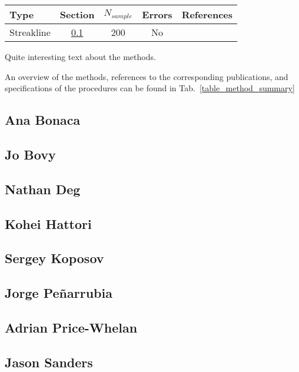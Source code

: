 \begin{table*}
\begin{minipage}{160mm}
\centering
 \caption{Overview of methods and their characteristics.}
\label{table_method_summary}
\begin{tabular}{lcccc}
\hline 
Type & Section & $N_{sample}$ & Errors & References\\
\hline 
Streakline & \ref{ssec:ana_method} & 200 & No & \citet{Bonaca14}\\ 
\end{tabular}
\end{minipage}
\end{table*}


Quite interesting text about the methods.

An overview of the methods, references to the corresponding publications, and specifications of the procedures can be found in Tab.~\ref{table_method_summary}

\subsection{Ana Bonaca}\label{ssec:ana_method}


\subsection{Jo Bovy}\label{ssec:jo_method}


\subsection{Nathan Deg}\label{ssec:nathan_method}


\subsection{Kohei Hattori}\label{ssec:kohei_method}


\subsection{Sergey Koposov}\label{ssec:sergey_method}


\subsection{Jorge Pe\~narrubia}\label{ssec:jorge_method}


\subsection{Adrian Price-Whelan}\label{ssec:adrian_method}


\subsection{Jason Sanders}\label{ssec:jason_method}
